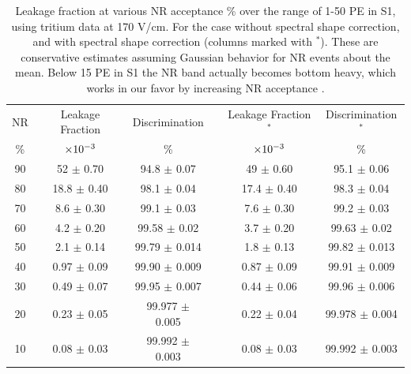 \renewcommand{\baselinestretch}{1}
\small\normalsize
\begin{table}[h!]
\begin{center}
\begin{tabular}{|c|c|c|c|c|c|}
\hline
 NR 	& Leakage Fraction 	& Discrimination 		&& Leakage Fraction$^{*}$ 	& Discrimination$^{*}$ \\
 	\%	&$\rm \times 10^{-3}$	&	\%					&&	$\rm \times 10^{-3}$		&	\%				       \\ \hline							
   90  	&	 	52  $\pm$ 0.70  	&	 94.8 $\pm$ 0.07   	&&	49 $\pm$ 0.60   		&	95.1 $\pm$ 0.06 		 \\ \hline
   80   	&		18.8 $\pm$ 0.40	&	 98.1 $\pm$ 0.04   	&&	17.4 $\pm$ 0.40  		&	 98.3 $\pm$ 0.04		\\ \hline
   70  	&	  	8.6  $\pm$ 0.30 	&	 99.1 $\pm$ 0.03   	&&	 7.6 $\pm$ 0.30   		&	99.2 $\pm$ 0.03		\\ \hline
   60  	&	  	4.2 $\pm$ 0.20  	&	 99.58 $\pm$ 0.02  	&&	 3.7 $\pm$ 0.20  		&	 99.63 $\pm$ 0.02		\\ \hline 
   50  	&	  	2.1 $\pm$ 0.14  	&	 99.79 $\pm$ 0.014   	&&	 1.8 $\pm$  0.13  		&	 99.82 $\pm$ 0.013	\\ \hline 
   40  	&	  	0.97  $\pm$ 0.09  	&	 99.90 $\pm$ 0.009  	&&	  0.87 $\pm$ 0.09  	&     99.91 $\pm$ 0.009	\\ \hline
   30  	&	  	0.49 $\pm$ 0.07  	&	 99.95 $\pm$ 0.007  	&&	  0.44 $\pm$ 0.06  	&      99.96 $\pm$ 0.006	\\ \hline
   20  	&	  	0.23 $\pm$ 0.05 	&	 99.977 $\pm$ 0.005  	&&   0.22 $\pm$ 0.04  		&	 99.978 $\pm$ 0.004	\\ \hline
   10   	&		0.08  $\pm$ 0.03	&	 99.992 $\pm$ 0.003	&&	  0.08 $\pm$ 0.03 		&	 99.992 $\pm$ 0.003	\\ \hline
\end{tabular}
\caption{Leakage fraction at various NR acceptance \% over the range of 1-50 PE in S1, using tritium data at 170 V/cm. For the case without spectral shape correction, and with spectral shape correction (columns marked with $^*$). These are conservative estimates assuming Gaussian behavior for NR events about the mean. Below 15 PE in S1 the NR band actually becomes bottom heavy, which works in our favor by increasing NR acceptance \cite{NEST} \cite{NEST_2013}.}
\label{table:NR_LeakFrac}
\end{center}
\end{table}
\renewcommand{\baselinestretch}{2}
\small\normalsize

